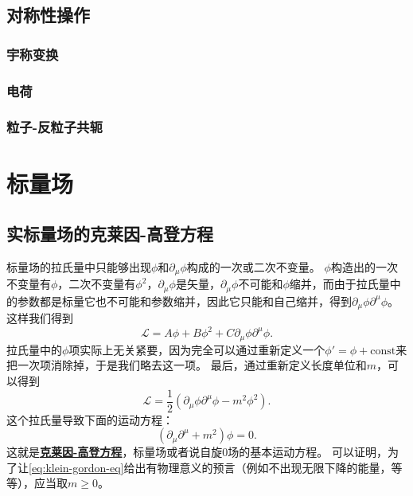 \documentclass[hyperref, UTF8, a4paper]{ctexart}
\newcommand*{\const}{\mathrm{const}}
\newcommand{\concept}[1]{\underline{\textbf{#1}}}
\begin{document}

\subsection{对称性操作}

\subsubsection{宇称变换}


\subsubsection{电荷}

\subsubsection{粒子-反粒子共轭}


\section{标量场}

\subsection{实标量场的克莱因-高登方程}\label{sec:k-g-eq}

标量场的拉氏量中只能够出现$\phi$和$\partial_\mu \phi$构成的一次或二次不变量。
$\phi$构造出的一次不变量有$\phi$，二次不变量有$\phi^2$，$\partial_\mu \phi$是矢量，$\partial_\mu \phi$不可能和$\phi$缩并，而由于拉氏量中的参数都是标量它也不可能和参数缩并，因此它只能和自己缩并，得到$\partial_\mu \phi \partial^\mu \phi$。
这样我们得到
\[
    \mathcal{L} = A \phi + B \phi^2 + C \partial_\mu \phi \partial^\mu \phi.
\]
拉氏量中的$\phi$项实际上无关紧要，因为完全可以通过重新定义一个$\phi' = \phi + \const$来把一次项消除掉，于是我们略去这一项。
最后，通过重新定义长度单位和$m$，可以得到
\begin{equation}
    \mathcal{L} = \frac{1}{2} (\partial_\mu \phi \partial^\mu \phi - m^2 \phi^2).
    \label{eq:klein-gordon-lagrangian}
\end{equation}
这个拉氏量导致下面的运动方程：
\begin{equation}
    (\partial_\mu \partial^\mu + m^2) \phi = 0.
    \label{eq:klein-gordon-eq}
\end{equation}
这就是\concept{克莱因-高登方程}，标量场或者说自旋0场的基本运动方程。
可以证明，为了让\eqref{eq:klein-gordon-eq}给出有物理意义的预言（例如不出现无限下降的能量，等等），应当取$m \geq 0$。
\end{document}
